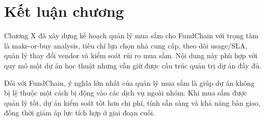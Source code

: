 \fi
\section{Kết luận chương}

Chương X đã xây dựng kế hoạch quản lý mua sắm cho FundChain với trọng tâm là make-or-buy analysis, tiêu chí lựa chọn nhà cung cấp, theo dõi usage/SLA, quản lý thay đổi vendor và kiểm soát rủi ro mua sắm. Nội dung này phù hợp với quy mô một dự án học thuật nhưng vẫn giữ được cấu trúc quản trị dự án đầy đủ.

Đối với FundChain, ý nghĩa lớn nhất của quản lý mua sắm là giúp dự án không bị lệ thuộc một cách bị động vào các dịch vụ ngoài nhóm. Khi mua sắm được quản lý tốt, dự án kiểm soát tốt hơn chi phí, tính sẵn sàng và khả năng bàn giao, đồng thời giảm áp lực tích hợp ở giai đoạn cuối.
